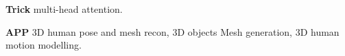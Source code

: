 \textbf{Trick} multi-head attention.

\textbf{APP} 3D human pose and mesh recon, 3D objects Mesh generation, 3D human motion modelling.






